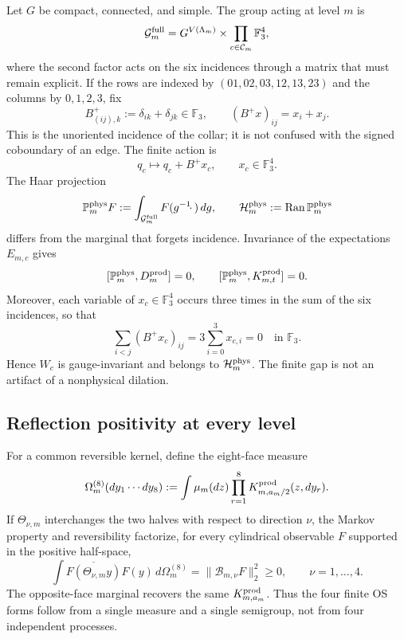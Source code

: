 Let $G$ be compact, connected, and simple. The group acting at level $m$ is
\[
 \mathcal G_m^{\rm full}
 =G^{V(\Lambda_m)}\times
  \prod_{c\in\mathcal C_m}\mathbb F_3^4,
\]
where the second factor acts on the six incidences through a matrix
that must remain explicit. If the rows are indexed by
$(01,02,03,12,13,23)$ and the columns by $0,1,2,3$, fix
\begin{equation}\label{eq:pdf2-ym-incidence-matrix}
 B^+_{(ij),k}:=\delta_{ik}+\delta_{jk}\in\mathbb F_3,
 \qquad
 (B^+x)_{ij}=x_i+x_j.
\end{equation}
This is the unoriented incidence of the collar; it is not confused with the
signed coboundary of an edge. The finite action is
\begin{equation}\label{eq:pdf2-ym-incidence-action}
 q_c\longmapsto q_c+B^+x_c,
 \qquad x_c\in\mathbb F_3^4.
\end{equation}
The Haar projection
\begin{equation}\label{eq:pdf2-ym-proyeccion-fisica}
 \mathbb P_m^{\rm phys}F
 :=\int_{\mathcal G_m^{\rm full}}F(g^{-1}\!\cdot\,)\,dg,
 \qquad
 \mathcal H_m^{\rm phys}:=\operatorname{Ran}\mathbb P_m^{\rm phys}
\end{equation}
differs from the marginal that forgets incidence. Invariance of the
expectations $E_{m,c}$ gives
\begin{equation}\label{eq:pdf2-ym-reduccion}
 [\mathbb P_m^{\rm phys},D_m^{\rm prod}]=0,
 \qquad
 [\mathbb P_m^{\rm phys},K_{m,t}^{\rm prod}]=0.
\end{equation}
Moreover, each variable of $x_c\in\mathbb F_3^4$ occurs three times in the sum of
the six incidences, so that
\begin{equation}\label{eq:pdf2-ym-incidence-conservation}
 \sum_{i<j}(B^+x_c)_{ij}
 =3\sum_{i=0}^3x_{c,i}=0
 \quad\text{in }\mathbb F_3.
\end{equation}
Hence $W_c$ is gauge-invariant
and belongs to $\mathcal H_m^{\rm phys}$. The finite gap is not an
artifact of a nonphysical dilation.

\subsection{Reflection positivity at every level}

For a common reversible kernel, define the eight-face measure
\begin{equation}\label{eq:pdf2-ym-ocho-caras}
 \Omega_m^{(8)}(dy_1\cdots dy_8)
 :=\int\mu_m(dz)\prod_{r=1}^{8}K^{\rm prod}_{m,a_m/2}(z,dy_r).
\end{equation}
If $\Theta_{\nu,m}$ interchanges the two halves with respect to direction
$\nu$, the Markov property and reversibility factorize, for every cylindrical
observable $F$ supported in the positive half-space,
\begin{equation}\label{eq:pdf2-ym-os-finita}
 \int\overline{F(\Theta_{\nu,m}y)}F(y)\,d\Omega_m^{(8)}
 =\|\mathcal B_{m,\nu}F\|_2^2\ge0,
 \qquad \nu=1,\ldots,4.
\end{equation}
The opposite-face marginal recovers the same
$K^{\rm prod}_{m,a_m}$. Thus the four finite OS forms follow
from a single measure and a single semigroup, not from four independent
processes.

